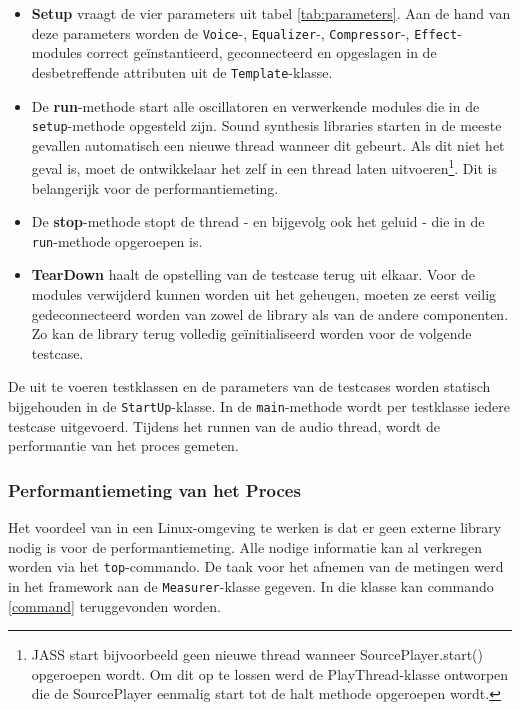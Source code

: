 \begin{itemize}
	\item \textbf{Setup} vraagt de vier parameters uit tabel \ref{tab:parameters}. Aan de hand van deze parameters worden de \verb+Voice+-, \verb+Equalizer+-, \verb+Compressor+-, \verb+Effect+-modules correct geïnstantieerd, geconnecteerd en opgeslagen in de desbetreffende attributen uit de \verb+Template+-klasse.
	\item De \textbf{run}-methode start alle oscillatoren en verwerkende modules die in de \verb+setup+-methode opgesteld zijn. Sound synthesis libraries starten in de meeste gevallen automatisch een nieuwe thread wanneer dit gebeurt. Als dit niet het geval is, moet de ontwikkelaar het zelf in een thread laten uitvoeren\footnote{JASS start bijvoorbeeld geen nieuwe thread wanneer SourcePlayer.start() opgeroepen wordt. Om dit op te lossen werd de PlayThread-klasse ontworpen die de SourcePlayer eenmalig start tot de halt methode opgeroepen wordt.}. Dit is belangerijk voor de performantiemeting. 
	\item De \textbf{stop}-methode stopt de thread - en bijgevolg ook het geluid - die in de \verb+run+-methode opgeroepen is.
	\item \textbf{TearDown} haalt de opstelling van de testcase terug uit elkaar. Voor de modules verwijderd kunnen worden uit het geheugen, moeten ze eerst veilig gedeconnecteerd worden van zowel de library als van de andere componenten. Zo kan de library terug volledig geïnitialiseerd worden voor de volgende testcase.
\end{itemize}

De uit te voeren testklassen en de parameters van de testcases worden statisch bijgehouden in de \verb+StartUp+-klasse. In de \verb+main+-methode wordt per testklasse iedere testcase uitgevoerd. Tijdens het runnen van de audio thread, wordt de performantie van het proces gemeten.

\subsubsection{Performantiemeting van het Proces}

Het voordeel van in een Linux-omgeving te werken is dat er geen externe library nodig is voor de performantiemeting. Alle nodige informatie kan al verkregen worden via het \verb+top+-commando. De taak voor het afnemen van de metingen werd in het framework aan de \verb+Measurer+-klasse gegeven. In die klasse kan commando \ref{command} teruggevonden worden.

